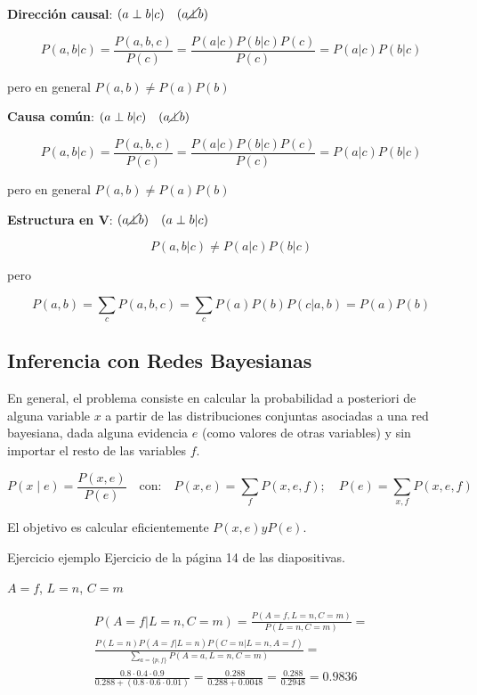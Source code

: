 \textbf{Dirección causal}: $(a \perp b | c) \quad (a \cancel{\perp} b )$

$$ P(a, b|c) = \frac{P(a, b, c)}{P(c)} = \frac{P(a|c) P(b|c) P(c)}{P(c)} = P(a|c) P(b|c) $$

pero en general $P(a, b) \neq P(a) P(b)$

\textbf{Causa común}: $ (a \perp b | c) \quad (a \cancel{\perp} b) $

$$ P(a, b|c) = \frac{P(a, b, c)}{P(c)} = \frac{P(a|c) P(b|c) P(c)}{P(c)} = P(a|c) P(b|c) $$

pero en general $P(a, b) \neq P(a) P(b)$

\textbf{Estructura en V}: $ (a \cancel{\perp} b) \quad (a \perp b | c) $

$$ P(a, b|c) \neq P(a|c) P(b|c) $$

pero 

$$ P(a, b) = \sum_c P(a, b, c) = \sum_c P(a) P(b) P(c | a, b) = P(a) P(b) $$

\subsection{Inferencia con Redes Bayesianas}

En general, el problema consiste en calcular la probabilidad a posteriori
de alguna variable $x$ a partir de las distribuciones conjuntas asociadas
a una red bayesiana, dada alguna evidencia $e$ (como valores de otras variables)
y sin importar el resto de las variables $f$.

\[
P(x \mid e) = \frac{P(x, e)}{P(e)} \quad \text{con:} \quad
P(x, e) = \sum_f P(x, e, f); \quad
P(e) = \sum_{x, f} P(x, e, f)
\]

El objetivo es calcular eficientemente $P(x, e) y P(e)$.

\begin{exercisebox}{Ejercicio ejemplo}
    Ejercicio de la página 14 de las diapositivas.
\end{exercisebox}

$ A = f $, $L = n$, $C = m$

\begin{align*}
P(A = f | L = n, C = m) = \frac{P(A = f, L = n, C = m)}{P(L = n, C = m)} = \\[1em]
\frac{P(L = n) P(A = f | L = n) P(C = n | L = n, A = f)}{\sum_{a = \{p, f\}} P(A=a, L=n, C=m)} = \\[1em]
\frac{0.8 \cdot 0.4 \cdot 0.9}{0.288 + (0.8 \cdot 0.6 \cdot 0.01)} = \frac{0.288}{0.288 + 0.0048} = \frac{0.288}{0.2948} = 0.9836
\end{align*}

